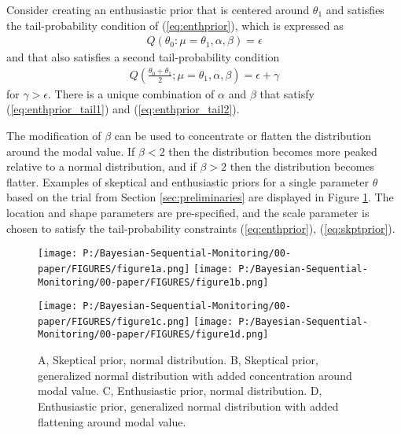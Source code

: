 \documentclass[12pt]{article}
\begin{document}
Consider creating an enthusiastic prior that is centered around $\theta_1$ and satisfies the tail-probability condition of (\ref{eq:enthprior}), which is expressed as 
\begin{align}\label{eq:enthprior_tail1}
Q(\theta_0:\mu=\theta_1,\alpha,\beta)=\epsilon
\end{align} and that also satisfies a second tail-probability condition 
\begin{align}
Q\left(\frac{\theta_0+\theta_1}{2};\mu=\theta_1,\alpha,\beta\right)=\epsilon+\gamma \label{eq:enthprior_tail2}
\end{align}
for $\gamma>\epsilon$. There is a unique combination of $\alpha$ and $\beta$ that satisfy (\ref{eq:enthprior_tail1}) and (\ref{eq:enthprior_tail2}).


The modification of $\beta$ can be used to concentrate or flatten the distribution around the modal value. If $\beta<2$ then the distribution becomes more peaked relative to a normal distribution, and if $\beta>2$ then the distribution becomes flatter. Examples of skeptical and enthusiastic priors for a single parameter $\theta$ based on the trial from Section \ref{sec:preliminaries} are displayed in Figure \ref{fig:figure1}. The location and shape parameters are pre-specified, and the scale parameter is chosen to satisfy the tail-probability constraints (\ref{eq:enthprior}), (\ref{eq:skptprior}).

%

\begin{figure}\begin{center}
\texttt{[image: P:/Bayesian-Sequential-Monitoring/00-paper/FIGURES/figure1a.png]}
\texttt{[image: P:/Bayesian-Sequential-Monitoring/00-paper/FIGURES/figure1b.png]}

\texttt{[image: P:/Bayesian-Sequential-Monitoring/00-paper/FIGURES/figure1c.png]}
\texttt{[image: P:/Bayesian-Sequential-Monitoring/00-paper/FIGURES/figure1d.png]}

\caption{A, Skeptical prior, normal distribution. B, Skeptical prior, generalized normal distribution with added concentration around modal value. C, Enthusiastic prior, normal distribution. D, Enthusiastic prior, generalized normal distribution with added flattening around modal value.}
\label{fig:figure1}
\end{center}\end{figure}
\end{document}
